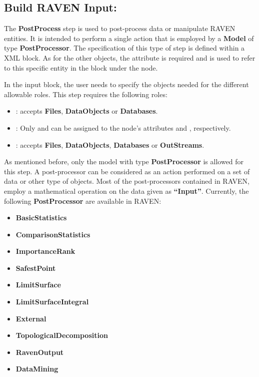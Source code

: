 \subsection{Build RAVEN Input: }
\label{sub:ravenPostProcess}
The \textbf{PostProcess} step is used to post-process data or manipulate RAVEN entities. It is intended to perform
a single action that is employed by a \textbf{Model} of type \textbf{PostProcessor}. The specification of this
type of step is defined within a  XML block. As for the other objects, the attribute 
 is required and is used to refer to this specific entity in the  block under
the  node.

In the  input block, the user needs to specify the objects needed for the different allowable
roles. This step requires the following roles:

\begin{itemize}
  \item {}: accepts \textbf{Files}, \textbf{DataObjects} or \textbf{Databases}.
  \item {}: Only  and  can be assigned to the node's
    attributes  and , respectively.
  \item {}: accepts \textbf{Files}, \textbf{DataObjects}, \textbf{Databases} or \textbf{OutStreams}.
\end{itemize}

As mentioned before, only the model with type \textbf{PostProcessor} is allowed for this step. A post-processor
can be considered as an action performed on a set of data or other type of objects. Most of the post-processors
contained in RAVEN, employ a mathematical operation on the data given as \textbf{``Input''}. Currently, the
following \textbf{PostProcessor} are available in RAVEN:

\begin{itemize}
  \itemsep0em
  \item \textbf{BasicStatistics}
  \item \textbf{ComparisonStatistics}
  \item \textbf{ImportanceRank}
  \item \textbf{SafestPoint}
  \item \textbf{LimitSurface}
  \item \textbf{LimitSurfaceIntegral}
  \item \textbf{External}
  \item \textbf{TopologicalDecomposition}
  \item \textbf{RavenOutput}
  \item \textbf{DataMining}
\end{itemize}

